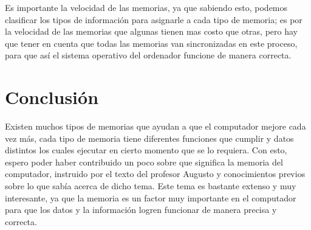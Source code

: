 \documentclass{article}
\begin{document}
Es importante la velocidad de las memorias, ya que sabiendo esto, podemos clasificar los tipos de información para asignarle a cada tipo de memoria; es por la velocidad de las memorias que algunas tienen mas costo que otras, pero hay que tener en cuenta que todas las memorias van sincronizadas en este proceso, para que así el sistema operativo del ordenador funcione de manera correcta. 

\section{Conclusión} \label{conclusion}
Existen muchos tipos de memorias que ayudan a que el computador mejore cada vez más, cada tipo de memoria tiene diferentes funciones que cumplir y datos distintos los cuales ejecutar en cierto momento que se lo requiera. Con esto, espero poder haber contribuido un poco sobre que significa la memoria del computador, instruido por el texto del profesor Augusto y conocimientos previos sobre lo que sabía acerca de dicho tema. Este tema es bastante extenso y muy interesante, ya que la memoria es un factor muy importante en el computador para que los datos y la información logren funcionar de manera precisa y correcta.
\newpage


\end{document}
